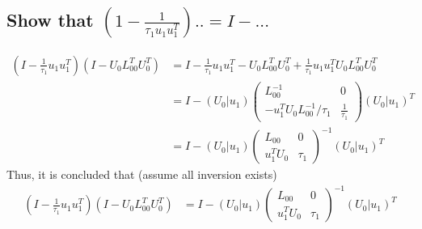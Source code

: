 \documentclass[11pt,a4paper]{article}
\begin{document}
\subsection{Show that $(1-\frac{1}{\tau_1 u_1 u_1^T}) .. = I - ...$}
\begin{align}
    (I - \frac{1}{\tau_1} u_1 u_1^T) (I - U_0 L_{00}^T U_0^T) 
   &= I - \frac{1}{\tau_1} u_1 u_1^T - U_0 L_{00}^T U_0^T
   + \frac{1}{\tau_1} u_1 u_1^T U_0 L_{00}^T U_0^T \\
   &= I - (U_0 | u_1) 
      \left( \begin{array}{c|c} 
              L_{00}^{-1} & 0 \\ \hline
              - u_1^T U_0 L_{00}^{-1}/\tau_1 & \frac{1}{\tau_1}
          \end{array} \right)
   (U_0 | u_1)^{T}  \\
   &= I - (U_0 | u_1) 
      \left( \begin{array}{c|c} 
              L_{00} & 0 \\ \hline
               u_1^T U_0 & \tau_1
           \end{array} \right)^{-1}
   (U_0 | u_1)^{T} 
\end{align}
Thus, it is concluded that (assume all inversion exists)
\begin{align}
    (I - \frac{1}{\tau_1} u_1 u_1^T) (I - U_0 L_{00}^T U_0^T) 
  &= I - (U_0 | u_1) 
      \left( \begin{array}{c|c} 
              L_{00} & 0 \\ \hline
               u_1^T U_0 & \tau_1
           \end{array} \right)^{-1}
   (U_0 | u_1)^{T} 
\end{align}

\newpage
\end{document}
